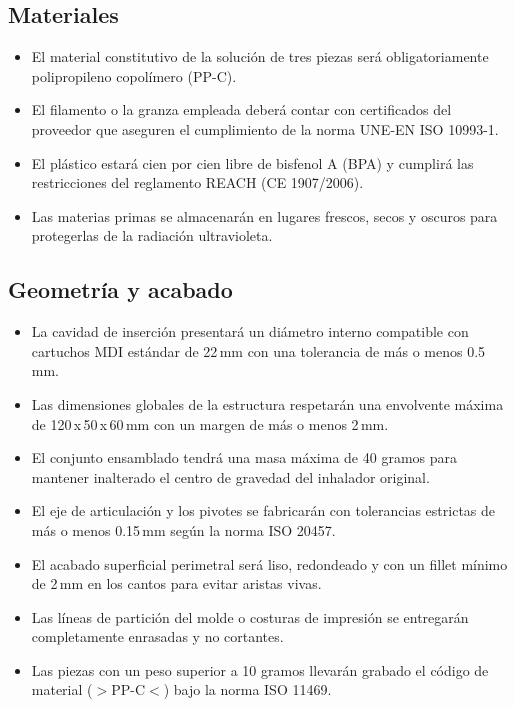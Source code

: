 \documentclass[11pt,a4paper]{article}
\begin{document}
\subsection{Materiales}
\begin{itemize}
    \item El material constitutivo de la solución de tres piezas será obligatoriamente polipropileno copolímero (PP-C).
    \item El filamento o la granza empleada deberá contar con certificados del proveedor que aseguren el cumplimiento de la norma UNE-EN ISO 10993-1.
    \item El plástico estará cien por cien libre de bisfenol A (BPA) y cumplirá las restricciones del reglamento REACH (CE 1907/2006).
    \item Las materias primas se almacenarán en lugares frescos, secos y oscuros para protegerlas de la radiación ultravioleta.
\end{itemize}

\subsection{Geometría y acabado}
\begin{itemize}
    \item La cavidad de inserción presentará un diámetro interno compatible con cartuchos MDI estándar de 22\,mm con una tolerancia de más o menos 0.5\,mm.
    \item Las dimensiones globales de la estructura respetarán una envolvente máxima de 120\,x\,50\,x\,60\,mm con un margen de más o menos 2\,mm.
    \item El conjunto ensamblado tendrá una masa máxima de 40 gramos para mantener inalterado el centro de gravedad del inhalador original.
    \item El eje de articulación y los pivotes se fabricarán con tolerancias estrictas de más o menos 0.15\,mm según la norma ISO 20457.
    \item El acabado superficial perimetral será liso, redondeado y con un fillet mínimo de 2\,mm en los cantos para evitar aristas vivas.
    \item Las líneas de partición del molde o costuras de impresión se entregarán completamente enrasadas y no cortantes.
    \item Las piezas con un peso superior a 10 gramos llevarán grabado el código de material ($>$PP-C$<$) bajo la norma ISO 11469.
\end{itemize}
\end{document}
